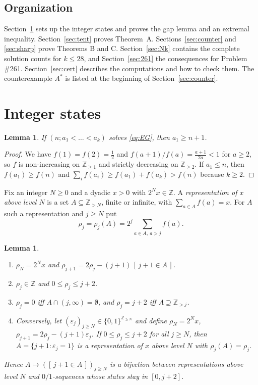 \documentclass[11pt]{amsart}
\newtheorem{lemma}[theorem]{Lemma}
\theoremstyle{definition}
\theoremstyle{remark}
\newcommand{\Z}{\mathbb{Z}}
\begin{document}
\subsection*{Organization}
Section~\ref{sec:states} sets up the integer states and proves the gap lemma and an extremal inequality. Section~\ref{sec:tent} proves Theorem~A. Sections~\ref{sec:counter} and \ref{sec:sharp} prove Theorems B and C. Section~\ref{sec:Nk} contains the complete solution counts for $k\le28$, and Section~\ref{sec:261} the consequences for Problem \#261. Section~\ref{sec:cert} describes the computations and how to check them. The counterexample $A^*$ is listed at the beginning of Section~\ref{sec:counter}.

\section{Integer states}\label{sec:states}

\begin{lemma}\label{lem:a1}
If $(n;a_1<\dots<a_k)$ solves \eqref{eq:EG}, then $a_1\ge n+1$.
\end{lemma}

\begin{proof}
We have $f(1)=f(2)=\tfrac12$ and $f(a+1)/f(a)=\frac{a+1}{2a}<1$ for $a\ge2$, so $f$ is non-increasing on $\Z_{\ge1}$ and strictly decreasing on $\Z_{\ge2}$. If $a_1\le n$, then $f(a_1)\ge f(n)$ and $\sum_i f(a_i)\ge f(a_1)+f(a_k)>f(n)$ because $k\ge2$.
\end{proof}

Fix an integer $N\ge0$ and a dyadic $x>0$ with $2^Nx\in\Z$. A \emph{representation of $x$ above level $N$} is a set $A\subseteq\Z_{>N}$, finite or infinite, with $\sum_{a\in A}f(a)=x$. For $A$ such a representation and $j\ge N$ put
\[
\rho_j=\rho_j(A)=2^j\sum_{a\in A,\ a>j}f(a).
\]

\begin{lemma}\label{lem:states}
\begin{enumerate}[label=\textup{(\roman*)}]
\item $\rho_N=2^Nx$ and $\rho_{j+1}=2\rho_j-(j+1)\,[\,j+1\in A\,]$.
\item $\rho_j\in\Z$ and $0\le\rho_j\le j+2$.
\item $\rho_j=0$ iff $A\cap(j,\infty)=\emptyset$, and $\rho_j=j+2$ iff $A\supseteq\Z_{>j}$.
\item Conversely, let $(\varepsilon_j)_{j\ge N}\in\{0,1\}^{\Z_{\ge N}}$ and define $\rho_N=2^Nx$, $\rho_{j+1}=2\rho_j-(j+1)\varepsilon_j$. If $0\le\rho_j\le j+2$ for all $j\ge N$, then $A=\{j+1:\varepsilon_j=1\}$ is a representation of $x$ above level $N$ with $\rho_j(A)=\rho_j$.
\end{enumerate}
Hence $A\mapsto([\,j+1\in A\,])_{j\ge N}$ is a bijection between representations above level $N$ and $0/1$-sequences whose states stay in $[0,j+2]$.
\end{lemma}
\end{document}
